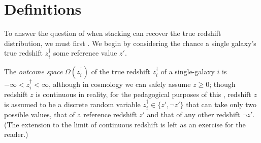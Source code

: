 \section{Definitions}



To answer the question of when stacking can recover the true redshift distribution, we must first .
We begin by considering the chance  a single galaxy's true redshift $z^{\dagger}_{i}$  some reference value $z'$.

\begin{definition}\label{def:binarystatespace}
	The \textit{outcome space} $\Omega(z^{\dagger}_{i})$ of the true redshift $z_{i}^{\dagger}$ of a single-galaxy $i$ is $-\infty < z^{\dagger}_{i} < \infty$, although in cosmology we can safely assume $z \geq 0$;
	though redshift $z$ is continuous in reality, for the pedagogical purposes of this , redshift $z$ is assumed to be a discrete random variable ${z_{i}^{\dagger} \in \{z', \lnot z'\}}$ that can take only two possible values, that of a reference redshift $z'$ and that of any other redshift $\lnot z'$.
    (The extension to the limit of continuous redshift is left as an exercise for the reader.)
\end{definition}

